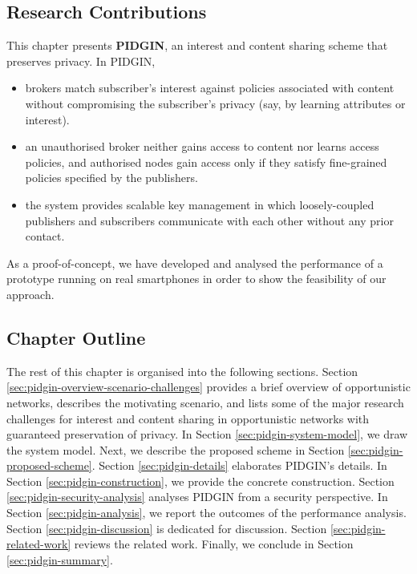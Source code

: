 \documentclass[epsfig,a4paper,11pt,titlepage]{book}
\numberwithin{algorithm}{chapter}
\begin{document}
\subsection{Research Contributions}

This chapter presents \textbf{\gls{PIDGIN}}, an interest and content sharing scheme that preserves privacy. In \gls{PIDGIN},

\begin{itemize}

	\item brokers match subscriber's interest against policies associated with content without compromising the subscriber's privacy (say, by learning attributes or interest).
	
	\item an unauthorised broker neither gains access to content nor learns access policies, and authorised nodes gain access only if they satisfy fine-grained policies specified by the publishers.

	\item the system provides scalable key management in which loosely-coupled publishers and subscribers communicate with each other without any prior contact.

\end{itemize}

As a proof-of-concept, we have developed and analysed the performance of a prototype running on real smartphones in order to show the feasibility of our approach.

\subsection{Chapter Outline}
The rest of this chapter is organised into the following sections.
Section \ref{sec:pidgin-overview-scenario-challenges} provides a brief overview of opportunistic networks, describes the motivating scenario, and lists some of the major research challenges for interest and content sharing in opportunistic networks with guaranteed preservation of privacy.
In Section \ref{sec:pidgin-system-model}, we draw the system model. 
Next, we describe the proposed scheme in Section \ref{sec:pidgin-proposed-scheme}.
Section \ref{sec:pidgin-details} elaborates \gls{PIDGIN}'s details. 
In Section \ref{sec:pidgin-construction}, we provide the concrete construction.
Section \ref{sec:pidgin-security-analysis} analyses \gls{PIDGIN} from a security perspective.
In Section \ref{sec:pidgin-analysis}, we report the outcomes of the performance analysis.
Section \ref{sec:pidgin-discussion} is dedicated for discussion.
Section \ref{sec:pidgin-related-work} reviews the related work.
Finally, we conclude in Section \ref{sec:pidgin-summary}.
\end{document}
